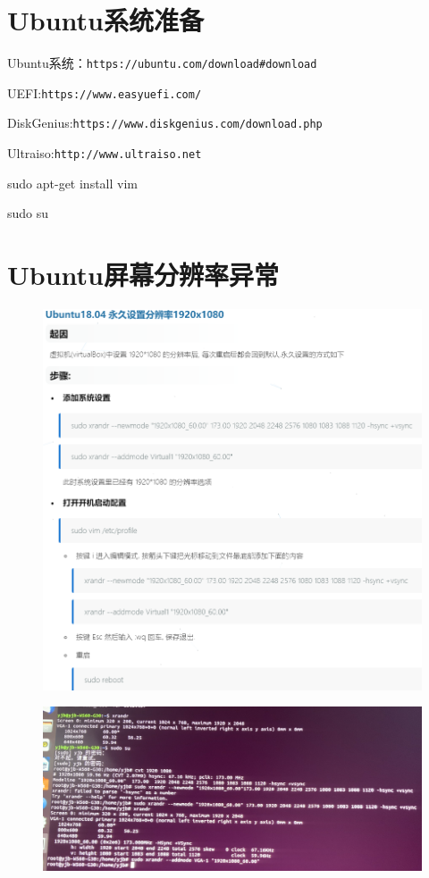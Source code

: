 \documentclass[11pt]{article}
\begin{document}
\begin{CJK}{UTF8}{gkai}
	

\section{Ubuntu系统准备}
Ubuntu系统：\texttt{https://ubuntu.com/download\#download}

UEFI:\texttt{https://www.easyuefi.com/}

DiskGenius:\texttt{https://www.diskgenius.com/download.php}

Ultraiso:\texttt{http://www.ultraiso.net}

sudo apt-get install vim

sudo su

\section{Ubuntu屏幕分辨率异常}
\begin{figure}[h]
	\centering
	\includegraphics[scale=0.5]{分辨率}
\end{figure}
\begin{figure}[h]
	\centering
	\includegraphics[scale=0.4]{分辨率2}
\end{figure}

\end{CJK}
\end{document}
